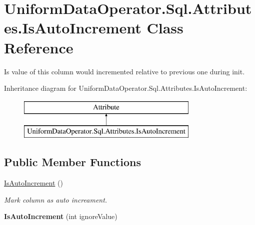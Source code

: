 \hypertarget{class_uniform_data_operator_1_1_sql_1_1_attributes_1_1_is_auto_increment}{}\section{Uniform\+Data\+Operator.\+Sql.\+Attributes.\+Is\+Auto\+Increment Class Reference}
\label{class_uniform_data_operator_1_1_sql_1_1_attributes_1_1_is_auto_increment}


Is value of this column would incremented relative to previous one during init.  


Inheritance diagram for Uniform\+Data\+Operator.\+Sql.\+Attributes.\+Is\+Auto\+Increment\+:\begin{figure}[H]
\begin{center}
\leavevmode
\includegraphics[height=2.000000cm]{d0/d59/class_uniform_data_operator_1_1_sql_1_1_attributes_1_1_is_auto_increment}
\end{center}
\end{figure}
\subsection*{Public Member Functions}
\begin{DoxyCompactItemize}
\item 
\mbox{\hyperlink{class_uniform_data_operator_1_1_sql_1_1_attributes_1_1_is_auto_increment_a738141c99b028f95fa9943dc385dd896}{Is\+Auto\+Increment}} ()
\begin{DoxyCompactList}\small\item\em Mark column as auto increament. \end{DoxyCompactList}\item 
\mbox{\label{class_uniform_data_operator_1_1_sql_1_1_attributes_1_1_is_auto_increment_ad3e160ed18c83920560794d457cb9f97}} 
{\bfseries Is\+Auto\+Increment} (int ignore\+Value)
\end{DoxyCompactItemize}
